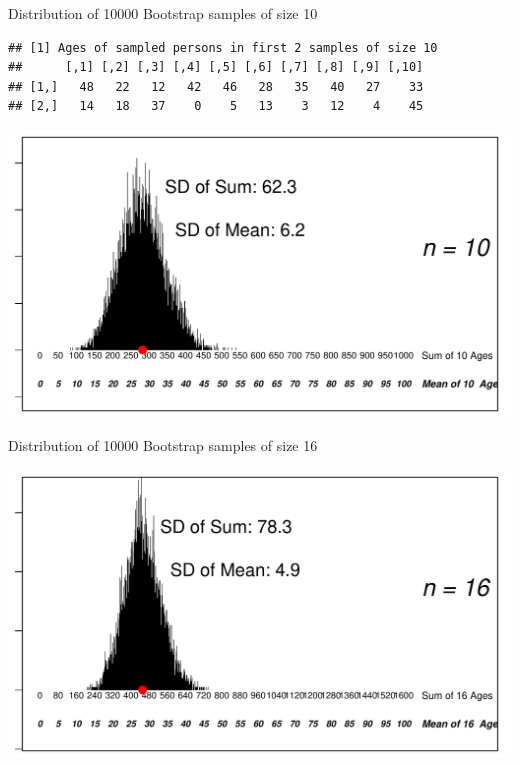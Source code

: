 \documentclass[10pt,handout]{beamer}\usepackage[]{graphicx}\usepackage[]{color}
\makeatletter
\def\maxwidth{ %
  \ifdim\Gin@nat@width>\linewidth
    \linewidth
  \else
    \Gin@nat@width
  \fi
}
\newenvironment{kframe}{%
 \def\at@end@of@kframe{}%
 \ifinner\ifhmode%
  \def\at@end@of@kframe{\end{minipage}}%
  \begin{minipage}{\columnwidth}%
 \fi\fi%
 \def\FrameCommand##1{\hskip\@totalleftmargin \hskip-\fboxsep
 \colorbox{shadecolor}{##1}\hskip-\fboxsep
     \hskip-\linewidth \hskip-\@totalleftmargin \hskip\columnwidth}%
 \MakeFramed {\advance\hsize-\width
   \@totalleftmargin\z@ \linewidth\hsize
   \@setminipage}}%
 {\par\unskip\endMakeFramed%
 \at@end@of@kframe}
\newenvironment{knitrout}{}{} %
\makeatother
\begin{document}
\begin{frame}[fragile]{Distribution of 10000 Bootstrap samples of size 10}
\begin{knitrout}\tiny
{}\color{fgcolor}\begin{kframe}
\begin{verbatim}
## [1] Ages of sampled persons in first 2 samples of size 10
##      [,1] [,2] [,3] [,4] [,5] [,6] [,7] [,8] [,9] [,10]
## [1,]   48   22   12   42   46   28   35   40   27    33
## [2,]   14   18   37    0    5   13    3   12    4    45
\end{verbatim}
\end{kframe}

{\centering \includegraphics[width=\maxwidth]{figure/unnamed-chunk-4-1} 

}



\end{knitrout}
	
\end{frame}




\begin{frame}[fragile]{Distribution of 10000 Bootstrap samples of size 16}
\begin{knitrout}\tiny
{}\color{fgcolor}

{\centering \includegraphics[width=\maxwidth]{figure/unnamed-chunk-5-1} 

}



\end{knitrout}
	
\end{frame}
\end{document}
